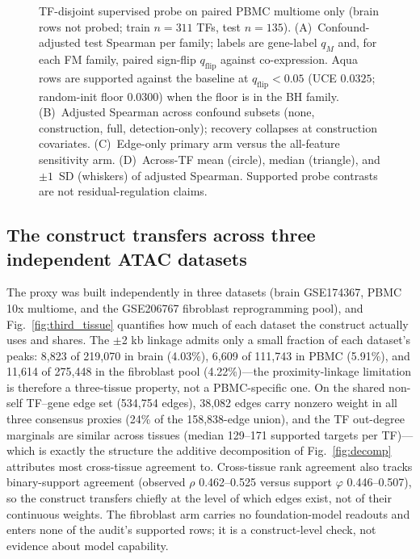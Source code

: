 \documentclass[fleqn,10pt,lineno]{wlpeerj}
\newcommand{\fitfig}[1]{\resizebox{\ifdim\width>\linewidth\linewidth\else\width\fi}{!}{#1}}
\begin{document}
\begin{figure}[!tbp]\centering
\fitfig{}
\caption{TF-disjoint supervised probe on paired PBMC multiome only (brain rows not probed;
train $n=311$ TFs, test $n=135$). (A)~Confound-adjusted test Spearman per family; labels are
gene-label $q_M$ and, for each FM family, paired sign-flip $q_{\mathrm{flip}}$ against
co-expression. Aqua rows are supported against the baseline at $q_{\mathrm{flip}}<0.05$ (UCE
$0.0325$; random-init floor $0.0300$) when the floor is in the BH family. (B)~Adjusted Spearman
across confound subsets (none, construction, full, detection-only); recovery collapses at
construction covariates. (C)~Edge-only primary arm versus the all-feature sensitivity arm.
(D)~Across-TF mean (circle), median (triangle), and $\pm 1$~SD (whiskers) of adjusted Spearman.
Supported probe contrasts are not residual-regulation claims.}\label{fig:probe}
\end{figure}

\subsection{The construct transfers across three independent ATAC datasets}\label{sec:third_tissue}
The proxy was built independently in three datasets (brain GSE174367, PBMC 10x multiome, and the
GSE206767 fibroblast reprogramming pool), and Fig.~\ref{fig:third_tissue} quantifies how much of
each dataset the construct actually uses and shares. The $\pm$2 kb linkage admits only a small
fraction of each dataset's peaks: 8,823 of 219,070 in brain (4.03\%), 6,609 of 111,743 in PBMC
(5.91\%), and 11,614 of 275,448 in the fibroblast pool (4.22\%)---the proximity-linkage limitation
is therefore a three-tissue property, not a PBMC-specific one. On the shared non-self TF--gene
edge set (534,754 edges), 38,082 edges carry nonzero weight in all three consensus proxies (24\%
of the 158,838-edge union), and the TF out-degree marginals are similar across tissues (median
129--171 supported targets per TF)---which is exactly the structure the additive decomposition of
Fig.~\ref{fig:decomp} attributes most cross-tissue agreement to. Cross-tissue rank agreement also
tracks binary-support agreement (observed $\rho$ 0.462--0.525 versus support $\varphi$
0.446--0.507), so the construct transfers chiefly at the level of which edges exist, not of their
continuous weights. The fibroblast arm carries no foundation-model readouts and enters none of the
audit's supported rows; it is a construct-level check, not evidence about model capability.
\end{document}
